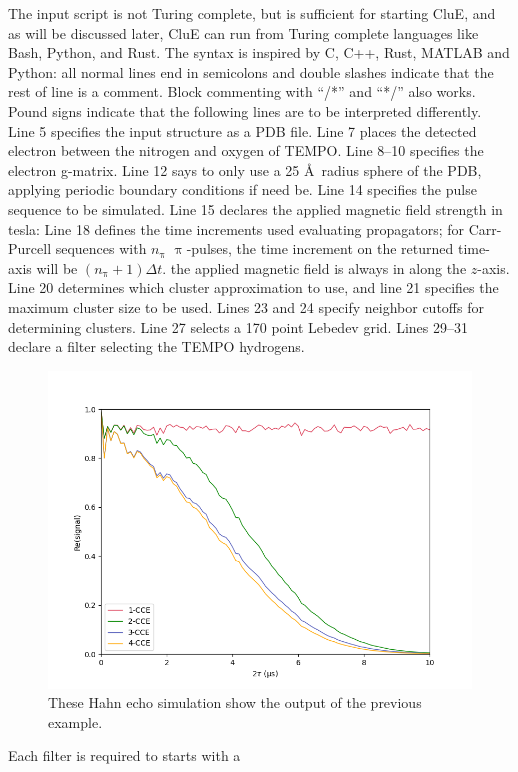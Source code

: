 \documentclass{book}
\begin{document}
The input script is not Turing complete, but is sufficient for starting CluE,
and as will be discussed later, CluE can run from Turing complete languages
like Bash, Python, and Rust.
The syntax is inspired by C, C++, Rust, MATLAB and Python:
all normal lines end in semicolons and double slashes indicate that the rest of 
line is a comment.  Block commenting with ``/*'' and ``*/'' also works. 
Pound signs indicate that the following lines are to be interpreted differently.
Line 5 specifies the input structure as a PDB file.  
Line 7 places the detected electron between the nitrogen and oxygen of TEMPO.
Line 8--10 specifies the electron g-matrix.
Line 12 says to only use a 25 \AA~radius sphere of the PDB, 
applying periodic boundary conditions if need be.
Line 14 specifies the pulse sequence to be simulated.
Line 15 declares the applied magnetic field strength in tesla: 
Line 18 defines the time increments used evaluating propagators; 
for Carr-Purcell sequences with $n_{\uppi}$ $\uppi$-pulses, 
the time increment on the returned time-axis will be $(n_{\uppi}+1)\Delta t$.  
the applied magnetic field is always in along the $z$-axis.
Line 20 determines which cluster approximation to use, 
and line 21 specifies the maximum cluster size to be used.
Lines 23 and 24 specify neighbor cutoffs for determining clusters.
Line 27 selects a 170 point Lebedev grid\cite{1999_Lebedev}.
Lines 29--31 declare a filter selecting the TEMPO hydrogens.
%
\begin{figure} [H]
	\centering
	\includegraphics[width=0.75\linewidth]{figs/fig_CluE-sims_n-CCE.png}
  \caption{These Hahn echo simulation show the output of the previous example.
  }
  \label{fig:example_ncce}
\end{figure}
%
%
Each filter is required to starts with a 
\end{document}
